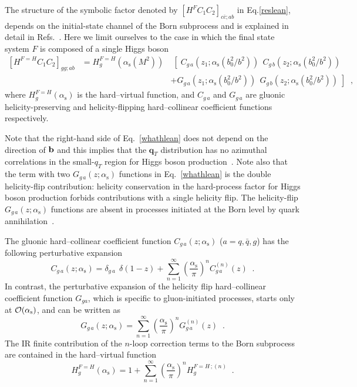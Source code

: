 \documentclass[12pt]{article}
\def\beeq{\begin{eqnarray}}
\def\eeeq{\end{eqnarray}}
\def\nn{\nonumber}
\DeclareRobustCommand{\as}{\ensuremath{\alpha_{\mathrm{s}}}}
\DeclareRobustCommand{\qt}{q_T}
\DeclareRobustCommand{\bqt}{\ensuremath{\mathbf{q}_T}}
\begin{document}
The structure of the symbolic factor denoted by $\left[ H^{F} C_1 C_2 \right]_{c\bar{c};a b}$ in Eq.\eqref{reslean}, depends on the initial-state channel of the Born subprocess and is explained in detail in Refs.~\cite{Catani:2010pd,Catani:2013tia}. Here we limit ourselves to the case in which the final state system $F$ is composed of a single Higgs boson
\beeq
\label{whathlean}
\left[ H^{F=H} C_1 C_2 \right]_{gg;ab}
&= H_{g}^{F=H}(\as(M^2)) &\;\left[ \; C_{g \,a}(z_1;\as(b_0^2/b^2)) 
\;\, C_{g \,b}(z_2;\as(b_0^2/b^2)) \right.
\nn \\
&&+ \left.  G_{g \,a}(z_1;\as(b_0^2/b^2)) 
\;\, G_{g \,b}(z_2;\as(b_0^2/b^2)) \;
\right]
\;\;,
\eeeq
where 
$H_{g}^{F=H}(\as)$ is the hard--virtual function, and $C_{g \,a}$ and $G_{g \,a}$ are 
gluonic helicity-preserving and helicity-flipping hard--collinear coefficient functions respectively.

Note that the right-hand side of Eq.~\eqref{whathlean} does not depend on the direction of $\bf b$ and this implies that the $\bqt$ distribution has no azimuthal correlations in the small-$\qt$ region for Higgs boson production~\cite{Catani:2010pd}. 
Note also that the term with two $G_{g \,a}(z;\as)$ functions in Eq.~\eqref{whathlean} is the double helicity-flip contribution: helicity conservation in the hard-process factor for Higgs boson production forbids contributions with a single helicity flip. 
The helicity-flip $G_{g \,a}(z;\as)$ functions are absent in processes initiated at the Born level by quark annihilation~\cite{Catani:2010pd}. 

The gluonic hard--collinear coefficient function $C_{g \,a}(z;\as)$ ($a=q,{\bar q},g$) has the following perturbative expansion
\begin{equation}
\label{cgexp} 
C_{g \,a}(z;\as) = \delta_{g \,a} \;\,\delta(1-z) + 
\sum_{n=1}^\infty \left( \frac{\as}{\pi} \right)^n C_{g\, a}^{(n)}(z) \;\;.
\end{equation}
In contrast, the perturbative expansion of the helicity flip hard--collinear coefficient function $G_{ga}$, which is specific to gluon-initiated processes, starts only at ${\cal O}(\as)$, and can be written as~\cite{Catani:2010pd,Catani:2013tia}
\begin{equation}
\label{gfexp}
G_{g \,a}(z;\as) =
\sum_{n=1}^\infty \left( \frac{\as}{\pi} \right)^n G_{g \,a}^{(n)}(z) \;\;.
\end{equation}
The IR finite contribution of the $n$-loop correction terms to the Born subprocess are contained in the hard--virtual function
\begin{equation}
\label{hexp}
H_g^{F=H}(\as) = 1+ \sum_{n=1}^\infty 
\left( \frac{\as}{\pi} \right)^n 
H_g^{F=H \,;(n)}
\;\;.
\end{equation} 
\end{document}
